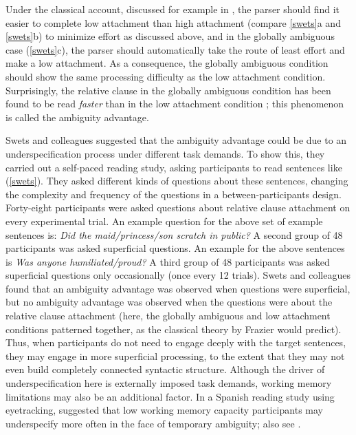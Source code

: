 \documentclass{cambridge7A}\usepackage[]{graphicx}\usepackage[]{color}
\begin{document}
Under the classical account, discussed for example in
\cite{FrazierRayner1982}, the parser should find it easier to complete  
low attachment than high attachment (compare \ref{swets}a and
\ref{swets}b) to minimize effort as discussed above, and in the
globally ambiguous case (\ref{swets}c), the parser should
automatically take the route of least effort and make a low
attachment. As a consequence, the globally ambiguous condition should
show the same processing difficulty as the low attachment 
condition. Surprisingly, the relative clause in the globally ambiguous
condition has been found to be read \textit{faster} than in the low
attachment condition \citep{TraxlerPickeringClifton1998}; this 
phenomenon is called the ambiguity advantage.

Swets and colleagues suggested that the ambiguity advantage could be
due to an underspecification process under different task demands.  To
show this, they carried out a self-paced reading study, asking
participants to read sentences like (\ref{swets}). They asked different
kinds of questions about these sentences, changing the complexity and
frequency of the questions in a between-participants
design. Forty-eight participants were asked questions about relative
clause attachment on every experimental trial. An example question for
the above set of example sentences is: \textit{Did the
maid/princess/son scratch in public?} A second group of 48
participants was asked superficial questions. An example for the above
sentences is \textit{Was anyone humiliated/proud?} A third group of
48 participants was asked superficial questions only occasionally
(once every 12 trials). Swets and colleagues found that an ambiguity
advantage was observed when questions were superficial, but no
ambiguity advantage was observed when the questions were about the
relative clause attachment (here, the globally ambiguous and low
attachment conditions patterned together, as the classical theory by
Frazier would predict). Thus, when participants do not need to engage
deeply with the target sentences, they may engage in more superficial
processing, to the extent that they may not even build completely
connected syntactic structure.  Although the driver of
underspecification here is externally imposed task demands, working memory limitations 
may also be an additional factor. In a Spanish reading study using
eyetracking, \cite{MalsburgVasishth2013} suggested that low working
memory capacity participants may underspecify more often in the face of
temporary ambiguity; also see \cite{Traxler2007}.
\end{document}
